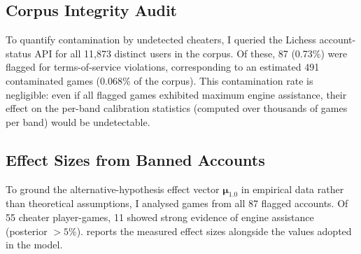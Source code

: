\documentclass[11pt,a4paper]{article}
\newcommand{\bmu}{\boldsymbol{\mu}}
\theoremstyle{definition}
\begin{document}
\subsection{Corpus Integrity Audit}
\label{sec:audit}

To quantify contamination by undetected cheaters, I queried the Lichess
account-status API for all 11{,}873 distinct users in the corpus.  Of
these, 87 (0.73\%) were flagged for terms-of-service violations,
corresponding to an estimated 491 contaminated games (0.068\% of the
corpus).  This contamination rate is negligible: even if all flagged
games exhibited maximum engine assistance, their effect on the per-band
calibration statistics (computed over thousands of games per band) would
be undetectable.

\subsection{Effect Sizes from Banned Accounts}
\label{sec:effects}

To ground the alternative-hypothesis effect vector $\bmu_{1.0}$ in
empirical data rather than theoretical assumptions, I analysed games
from all 87 flagged accounts.  Of 55 cheater player-games, 11 showed
strong evidence of engine assistance (posterior $> 5\%$).
 reports the measured effect sizes alongside the
values adopted in the model.
\end{document}
